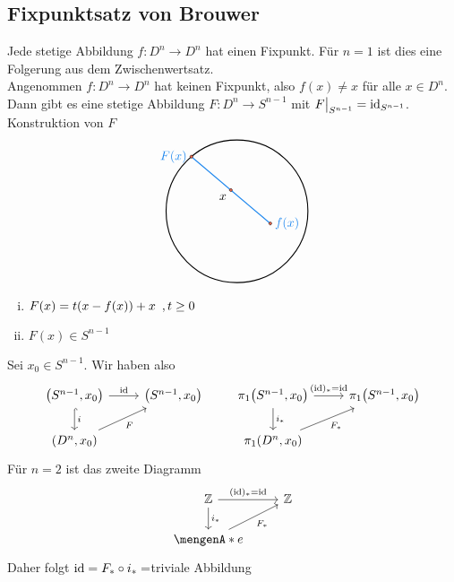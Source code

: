 \subsection{Fixpunktsatz von Brouwer} %
\label{sub:11.8}
Jede stetige Abbildung $f : D^n \to D^n$ hat einen Fixpunkt.
Für $n=1$ ist dies eine Folgerung aus dem Zwischenwertsatz. \smallskip \\
Angenommen $f : D^n \to D^n$ hat keinen Fixpunkt, also $f(x) \not= x$ für alle $x \in D^n$. Dann gibt es eine stetige Abbildung $F : D^n \to S^{n-1}$ mit 
$F\big|_{S^{n-1}} = \operatorname{id}_{S^{n-1}}$. Konstruktion von $F$
\[
	\begin{tikzpicture}
		\coordinate (Fx) at (130:2);
		\coordinate (fx) at (-20:1);
		\draw[thick] (0,0) circle[radius=2];
		\draw[thick, DodgerBlue2] (fx) node[right]{$f(x)$} -- (Fx) node[left]{$F(x)$} node[midway] (x) {};
		\node[below left] at (x) {$x$};
		\foreach \a in {Fx, fx, x}{
			\draw[fill=Coral2] (\a) circle[radius=0.04];
		}
	\end{tikzpicture} 
\]
\begin{enumerate}[(i)]
	\item $F(x) = t \enbrace*{x- f(x)} + x \enspace, t\ge 0$
	\item $F(x) \in S^{n-1}$
\end{enumerate}
Sei $x_0 \in S^{n-1}$. Wir haben also
\[
	\begin{tikzcd}
		\enbrace*{S^{n-1}, x_0} \rar{\id} \dar[hook]{i} & \enbrace*{S^{n-1}, x_0} \\
		\enbrace*{D^n, x_0} \urar[swap]{F}
	\end{tikzcd}
	\qquad \begin{tikzcd}
		\pi_1 \enbrace*{S^{n-1}, x_0} \rar{(\id)_* =\id}  \dar{i_*}& \pi_1 \enbrace*{S^{n-1}, x_0} \\
		\pi_1 \enbrace*{D^n, x_0} \urar[swap]{F_*}   
	\end{tikzcd}
\]
Für $n=2$ ist das zweite Diagramm
\[
	\begin{tikzcd}
			\mathds{Z} \rar{(\id)_* =\id}  \dar{i_*}& \mathds{Z} \\
			\set{e} \urar[swap]{F_*} 
		\end{tikzcd}
\]
Daher folgt $\operatorname{id} = F_* \circ  i_* = $triviale Abbildung \light \bewende

